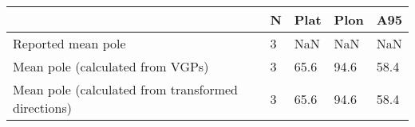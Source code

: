 \begin{tabular}{lllll}
\toprule
{} &  N &  Plat &  Plon &   A95 \\
\midrule
Reported mean pole                                 &  3 &   NaN &   NaN &   NaN \\
Mean pole (calculated from VGPs)                   &  3 &  65.6 &  94.6 &  58.4 \\
Mean pole (calculated from transformed directions) &  3 &  65.6 &  94.6 &  58.4 \\
\bottomrule
\end{tabular}
